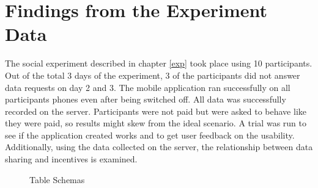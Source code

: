\section{Findings from the Experiment Data}

The social experiment described in chapter \ref{exp} took place using 10 participants. Out of the total 3 days of the experiment, 3 of the participants did not answer data requests on day 2 and 3. The mobile application ran successfully on all participants phones even after being switched off. All data was successfully recorded on the server. Participants were not paid but were asked to behave like they were paid, so results might skew from the ideal scenario. A trial was run to see if the application created works and to get user feedback on the usability. Additionally, using the data collected on the server, the relationship between data sharing and incentives is examined. 

\begin{figure}[htp]
\hspace{1em}
\caption{Table Schemas}
\label{fig:st3}
\end{figure}


